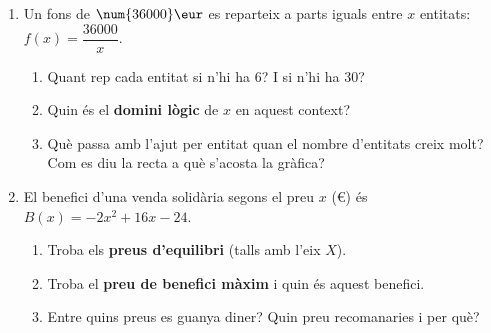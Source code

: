 \begin{enumerate}[label=\textbf{\arabic*.}, leftmargin=2em, itemsep=8pt, start=6]
  \item Un fons de $\num{36000}\eur$ es reparteix a parts iguals entre $x$ entitats:
        $f(x)=\dfrac{\num{36000}}{x}$.
    \begin{enumerate}[label=\alph*), leftmargin=1.6em, topsep=2pt]
      \item Quant rep cada entitat si n'hi ha $6$? I si n'hi ha $30$?
      \item Quin és el \textbf{domini lògic} de $x$ en aquest context?
      \item Què passa amb l'ajut per entitat quan el nombre d'entitats creix molt?
            Com es diu la recta a què s'acosta la gràfica?
    \end{enumerate}
  \item El benefici d'una venda solidària segons el preu $x$ (€) és
        $B(x)=-2x^2+16x-24$.
    \begin{enumerate}[label=\alph*), leftmargin=1.6em, topsep=2pt]
      \item Troba els \textbf{preus d'equilibri} (talls amb l'eix $X$).
      \item Troba el \textbf{preu de benefici màxim} i quin és aquest benefici.
      \item Entre quins preus es guanya diner? Quin preu recomanaries i per què?
    \end{enumerate}
\end{enumerate}

